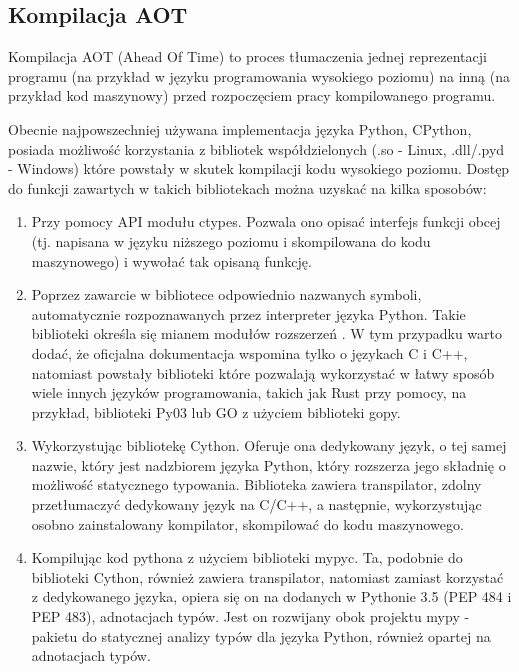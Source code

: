 \documentclass[11pt, a4paper]{article}
\begin{document}
\begin{sloppypar}
    \subsection{Kompilacja AOT}
    Kompilacja AOT (Ahead Of Time) to proces tłumaczenia jednej reprezentacji programu (na
    przykład w języku programowania wysokiego poziomu) na inną (na przykład kod maszynowy)
    przed rozpoczęciem pracy kompilowanego programu.

    Obecnie najpowszechniej używana implementacja języka Python, CPython, posiada
    możliwość korzystania z bibliotek współdzielonych (.so - Linux, .dll/.pyd - Windows)
    które powstały w skutek kompilacji kodu wysokiego poziomu. Dostęp do funkcji zawartych
    w takich bibliotekach można uzyskać na kilka sposobów:

    \begin{enumerate}
      \item Przy pomocy API modułu ctypes\cite{Python_ctypes}. Pozwala ono opisać interfejs
        funkcji obcej (tj. napisana w języku niższego poziomu i skompilowana do kodu maszynowego)
        i wywołać tak opisaną funkcję.

      \item Poprzez zawarcie w bibliotece odpowiednio nazwanych symboli, automatycznie
        rozpoznawanych przez interpreter języka Python. Takie biblioteki określa się mianem
        modułów rozszerzeń \cite{Extending_Python_With_C_Cpp}. W tym przypadku warto
        dodać, że oficjalna dokumentacja wspomina tylko o językach C i C++, natomiast
        powstały biblioteki które pozwalają wykorzystać w łatwy sposób wiele innych
        języków programowania, takich jak Rust przy pomocy, na przykład, biblioteki Py03\cite{PyO3}
        lub GO z użyciem biblioteki gopy\cite{gopy}.

      \item Wykorzystując bibliotekę Cython\cite{Cython_Org}\cite{Cython_The_Best_Of_Both}.
        Oferuje ona dedykowany język, o tej samej nazwie, który jest nadzbiorem języka
        Python, który rozszerza jego składnię o możliwość statycznego typowania.
        Biblioteka zawiera transpilator, zdolny przetłumaczyć dedykowany język na C/C++,
        a następnie, wykorzystując osobno zainstalowany kompilator, skompilować do kodu
        maszynowego.

      \item Kompilując kod pythona z użyciem biblioteki mypyc\cite{mypyc}. Ta, podobnie
        do biblioteki Cython, również zawiera transpilator, natomiast zamiast korzystać
        z dedykowanego języka, opiera się on na dodanych w Pythonie 3.5\cite{Python_3_5}
        (PEP 484\cite{PEP_484} i PEP 483\cite{PEP_483}), adnotacjach typów. Jest on
        rozwijany obok projektu mypy - pakietu do statycznej analizy typów dla języka
        Python, również opartej na adnotacjach typów\cite{mypy}.
    \end{enumerate}


\end{sloppypar}
\end{document}
